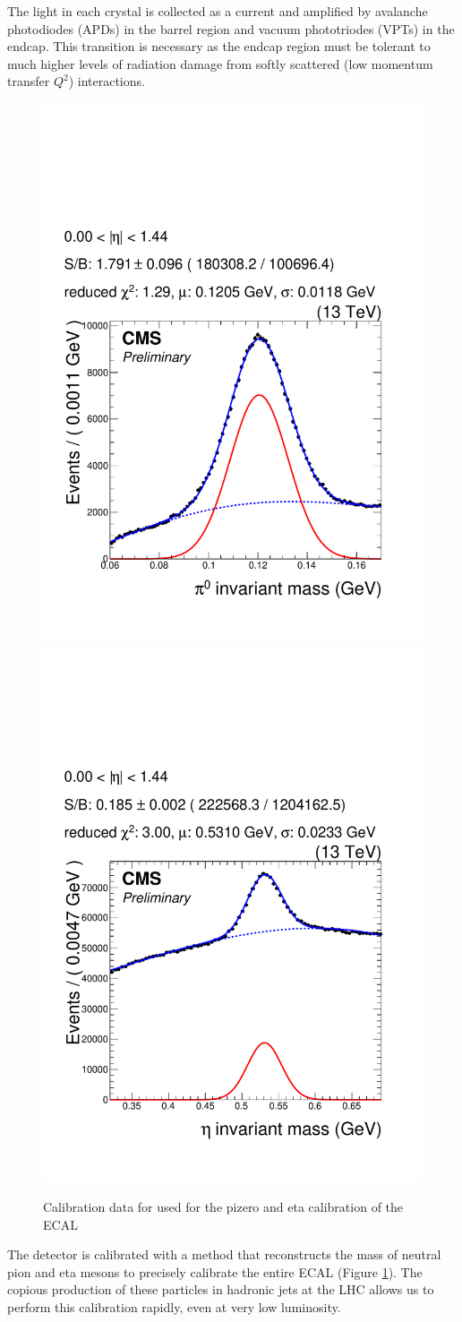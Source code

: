 The light in each crystal is collected as a current 
and amplified by avalanche photodiodes (APDs) in the barrel
region and vacuum phototriodes (VPTs) in the endcap. This transition is
necessary as the endcap region must be tolerant to much
higher levels of radiation damage from softly scattered (low momentum transfer $Q^2$)
interactions. 
\begin{figure}
\begin{center}
\includegraphics[width=.45\textwidth]{pics/pizero_eb}
\includegraphics[width=.45\textwidth]{pics/eta_eb_2015b}
\end{center}
\caption{Calibration data for used for the pizero and eta calibration of the ECAL}
\label{fig:pizero_eta}
\end{figure}
The detector is calibrated with a method that reconstructs the mass of neutral
pion and eta mesons to precisely calibrate the entire ECAL (Figure \ref{fig:pizero_eta}). 
The copious production of these particles in hadronic jets at the LHC allows us to
perform this calibration rapidly, even at very low luminosity. 

